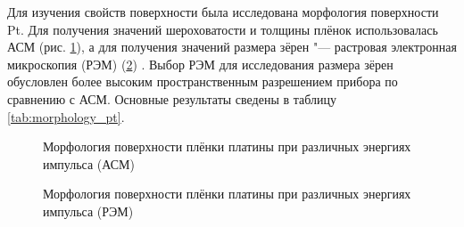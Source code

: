 Для изучения свойств поверхности была исследована морфология поверхности Pt. Для получения значений шероховатости и толщины плёнок использовалась АСМ (рис. \cref{fig:afm:morphology}), а для получения значений размера зёрен "--- растровая электронная микроскопия (РЭМ) (\cref{fig:sem:morphology}) . Выбор РЭМ для исследования размера зёрен обусловлен более высоким пространственным разрешением прибора по сравнению с АСМ. Основные результаты сведены в таблицу \cref{tab:morphology_pt}.
\begin{figure}[ht]
    \caption[Этот текст попадает в названия рисунков в списке рисунков]{Морфология поверхности плёнки платины при различных энергиях импульса (АСМ)}\label{fig:afm:morphology}
\end{figure}

\begin{figure}[ht]
    \caption[Этот текст попадает в названия рисунков в списке рисунков]{Морфология поверхности плёнки платины при различных энергиях импульса (РЭМ)}\label{fig:sem:morphology}
\end{figure}

